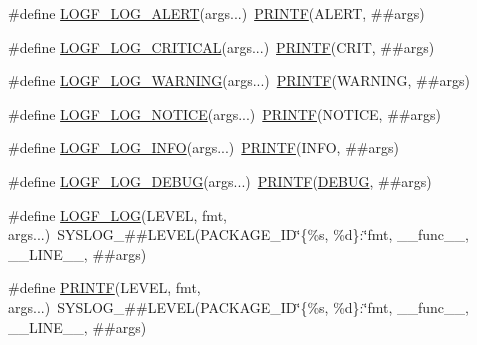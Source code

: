 \begin{DoxyCompactItemize}
\item 
\#define \hyperlink{group__SYSFRAMEWORK__LOG_ga5c99a255cabecdad258745297d5678d8}{L\-O\-G\-F\-\_\-\-L\-O\-G\-\_\-\-A\-L\-E\-R\-T}(args...)~\hyperlink{group__SYSFRAMEWORK__LOG_gad38f8471f267bf2d5b61bff49d3f8f7f}{P\-R\-I\-N\-T\-F}(A\-L\-E\-R\-T, \#\#args)
\item 
\#define \hyperlink{group__SYSFRAMEWORK__LOG_gaef161c193f8dcd83349eb0c0515861a8}{L\-O\-G\-F\-\_\-\-L\-O\-G\-\_\-\-C\-R\-I\-T\-I\-C\-A\-L}(args...)~\hyperlink{group__SYSFRAMEWORK__LOG_gad38f8471f267bf2d5b61bff49d3f8f7f}{P\-R\-I\-N\-T\-F}(C\-R\-I\-T, \#\#args)
\item 
\#define \hyperlink{group__SYSFRAMEWORK__LOG_ga23b166efe08815e9d97f2a30a2ff97f7}{L\-O\-G\-F\-\_\-\-L\-O\-G\-\_\-\-W\-A\-R\-N\-I\-N\-G}(args...)~\hyperlink{group__SYSFRAMEWORK__LOG_gad38f8471f267bf2d5b61bff49d3f8f7f}{P\-R\-I\-N\-T\-F}(W\-A\-R\-N\-I\-N\-G, \#\#args)
\item 
\#define \hyperlink{group__SYSFRAMEWORK__LOG_ga6629207f9928999a6e540422f48f1418}{L\-O\-G\-F\-\_\-\-L\-O\-G\-\_\-\-N\-O\-T\-I\-C\-E}(args...)~\hyperlink{group__SYSFRAMEWORK__LOG_gad38f8471f267bf2d5b61bff49d3f8f7f}{P\-R\-I\-N\-T\-F}(N\-O\-T\-I\-C\-E, \#\#args)
\item 
\#define \hyperlink{group__SYSFRAMEWORK__LOG_ga8ce0b241ee6ed787655fc6c683610cfa}{L\-O\-G\-F\-\_\-\-L\-O\-G\-\_\-\-I\-N\-F\-O}(args...)~\hyperlink{group__SYSFRAMEWORK__LOG_gad38f8471f267bf2d5b61bff49d3f8f7f}{P\-R\-I\-N\-T\-F}(I\-N\-F\-O, \#\#args)
\item 
\#define \hyperlink{group__SYSFRAMEWORK__LOG_ga0f75fa476eefdbfae8ed503bd116ccbd}{L\-O\-G\-F\-\_\-\-L\-O\-G\-\_\-\-D\-E\-B\-U\-G}(args...)~\hyperlink{group__SYSFRAMEWORK__LOG_gad38f8471f267bf2d5b61bff49d3f8f7f}{P\-R\-I\-N\-T\-F}(\hyperlink{structDEBUG}{D\-E\-B\-U\-G}, \#\#args)
\item 
\#define \hyperlink{group__SYSFRAMEWORK__LOG_ga1e820f025f360fdd6c8248849cb3fa92}{L\-O\-G\-F\-\_\-\-L\-O\-G}(L\-E\-V\-E\-L, fmt, args...)~S\-Y\-S\-L\-O\-G\-\_\-\#\#L\-E\-V\-E\-L(P\-A\-C\-K\-A\-G\-E\-\_\-\-I\-D\char`\"{}\{\%s, \%d\}\-:\char`\"{}fmt, \-\_\-\-\_\-func\-\_\-\-\_\-, \-\_\-\-\_\-\-L\-I\-N\-E\-\_\-\-\_\-, \#\#args)
\item 
\#define \hyperlink{group__SYSFRAMEWORK__LOG_gad38f8471f267bf2d5b61bff49d3f8f7f}{P\-R\-I\-N\-T\-F}(L\-E\-V\-E\-L, fmt, args...)~S\-Y\-S\-L\-O\-G\-\_\-\#\#L\-E\-V\-E\-L(P\-A\-C\-K\-A\-G\-E\-\_\-\-I\-D\char`\"{}\{\%s, \%d\}\-:\char`\"{}fmt, \-\_\-\-\_\-func\-\_\-\-\_\-, \-\_\-\-\_\-\-L\-I\-N\-E\-\_\-\-\_\-, \#\#args)
\item 

\end{DoxyCompactItemize}
